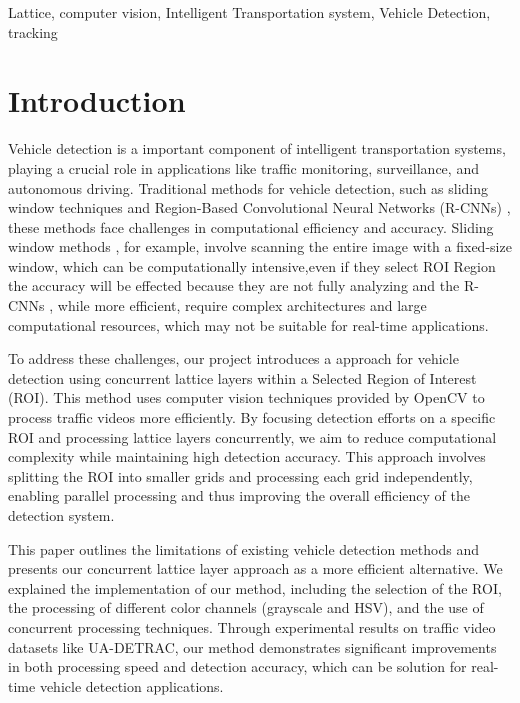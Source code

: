\documentclass[conference]{IEEEtran}
\begin{document}
\begin{IEEEkeywords}
Lattice, computer vision, Intelligent Transportation system, Vehicle Detection, tracking
\end{IEEEkeywords}

\section{Introduction}
Vehicle detection is a important component of intelligent transportation systems, playing a crucial role in applications like traffic monitoring, surveillance, and autonomous driving. Traditional methods for vehicle detection, such as sliding window \cite{b11} techniques and Region-Based Convolutional Neural Networks (R-CNNs)  \cite{b2} , these methods face challenges in computational efficiency and accuracy. Sliding window methods \cite{b11}, for example, involve scanning the entire image with a fixed-size window, which can be computationally intensive,even if they select ROI Region the accuracy will be effected because they are not fully analyzing and the R-CNNs  \cite{b2}, while more efficient, require complex architectures and large computational resources, which may not be suitable for real-time applications.

To address these challenges, our project introduces a approach for vehicle detection using concurrent lattice layers within a Selected Region of Interest (ROI). This method uses computer vision techniques provided by OpenCV to process traffic videos more efficiently. By focusing detection efforts on a specific ROI and processing lattice layers concurrently, we aim to reduce computational complexity while maintaining high detection accuracy. This approach involves splitting the ROI into smaller grids and processing each grid independently, enabling parallel processing and thus improving the overall efficiency of the detection system.

This paper outlines the limitations of existing vehicle detection methods and presents our concurrent lattice layer approach as a more efficient alternative. We explained the implementation of our method, including the selection of the ROI, the processing of different color channels (grayscale and HSV), and the use of concurrent processing techniques. Through experimental results on traffic video datasets like UA-DETRAC, our method demonstrates significant improvements in both processing speed and detection accuracy, which can be solution for real-time vehicle detection applications.
\end{document}
